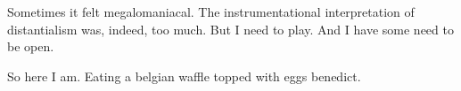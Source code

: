 

Sometimes it felt megalomaniacal.  The instrumentational
interpretation of distantialism was, indeed, too much.  But I need to
play.  And I have some need to be open.

So here I am.  Eating a belgian waffle topped with eggs benedict.  

\bye
